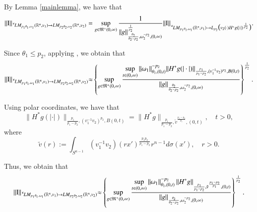 \documentclass[11pt]{amsart}
\theoremstyle{plain}
\theoremstyle{definition}
\numberwithin{thm}{section}
\numberwithin{equation}{section}
\begin{document}
By Lemma \ref{mainlemma}, we have that
\begin{align*}
\|{\operatorname{I}}\|_{{\,^{^{\bf c}}\!} LM_{p_1{\theta}_1,{\omega}_1}({{\mathbb R}^n},v_1){\rightarrow} LM_{p_2{\theta}_2,{\omega}_2}({{\mathbb R}^n},v_2)} =
\sup_{g\in {\mathfrak M}^+{(0,{\infty})}}
\frac{1}{\|g\|_{\frac{{\theta}_2}{{\theta}_2-p_2},{\omega}_2^{-p_2},(0,\infty)}^{\frac{1}{p_2}}}
\|{\operatorname{I}}\|_{{\,^{^{\bf c}}\!} LM_{p_1{\theta}_1,{\omega}_1}({{\mathbb R}^n},v_1){\rightarrow} L_{p_2}\big(v_2(\cdot)
	H^*g(|\cdot|)^{\frac{1}{p_2}}\big)}.
\end{align*}

Since ${\theta}_1\leq p_2$, applying \cite[Theorem~4.2, (a)]{mu_emb}, we obtain that
\begin{align*}
\|{\operatorname{I}}\|_{{\,^{^{\bf c}}\!} LM_{p_1{\theta}_1,{\omega}_1}({{\mathbb R}^n},v_1){\rightarrow} LM_{p_2{\theta}_2,{\omega}_2}({{\mathbb R}^n},v_2)} {\approx}
\left\{ \sup_{g\in {\mathfrak M}^+(0,\infty)} {\frac{\displaystyle {\sup_{t\in (0,\infty)}
	\|{\omega}_1\|_{{\theta}_1,(0,t)}^{- p_2} \|H^*g(|\cdot|)\|_{\frac{p_1}{p_1 - p_2},(v_1^{-1}v_2)^{p_2},B(0,t)}}}{\displaystyle {\|g\|_{\frac{{\theta}_2}{{\theta}_2-p_2},{\omega}_2^{-p_2},(0,\infty)}}}}\right\}^{\frac{1}{p_2}}.
\end{align*}

Using polar coordinates, we have that
\begin{equation*}
\|H^*g(|\cdot|)\|_{\frac{p_1}{p_1-p_2},(v_1^{-1}v_2)^{p_2},B(0,t)}=\|H^*g\|_{\frac{p_1}{p_1-p_2},{\tilde v}^{\frac{p_1-p_2}{p_1}},(0,t)}, \quad t>0,
\end{equation*}
where
\begin{equation*}
\tilde{v}(r):=\int_{S^{n-1}} (v_1^{-1}v_2)(rx')^{\frac{p_1p_2}{p_1- p_2}}r^{n-1}d\sigma(x'), \quad r > 0.
\end{equation*}

Thus, we obtain that\begin{align*}
\|{\operatorname{I}}\|_{{\,^{^{\bf c}}\!} LM_{p_1{\theta}_1,{\omega}_1}({{\mathbb R}^n},v_1){\rightarrow} LM_{p_2{\theta}_2,{\omega}_2}({{\mathbb R}^n},v_2)} {\approx} \left\{\sup_{g\in {\mathfrak M}^+{(0,{\infty})}} {\frac{\displaystyle {\sup_{t\in(0,\infty)} \|{\omega}_1\|_{{\theta}_1,(0,t)}^{-p_2} \left\|H^*g\right\|_{\frac{p_1}{p_1-p_2},{\tilde v}^{\frac{p_1-p_2}{p_1}},(0,t)}}}{\displaystyle {\|g\|_{\frac{{\theta}_2}{{\theta}_2-p_2},{\omega}_2^{-p_2},(0,\infty)}}}}\right\}^{\frac{1}{p_2}}.
\end{align*}
\end{document}
